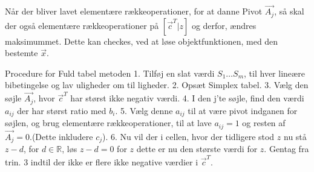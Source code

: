 Når der bliver lavet elementære rækkeoperationer, for at danne Pivot $\vec{A_j}$, så skal der også elementære rækkeoperationer på
$\left[\vec{c}^T | z\right]$ og derfor, ændres maksimummet. Dette kan checkes, ved at løse objektfunktionen, med den bestemte $\vec{x}$.
\begin{pro} [label=pro:simplex,numbers=none,xleftmargin=0em] {Procedure for Fuld tabel metoden}
1. Tilføj en slat værdi $S_1\dots S_m$, til hver lineære bibetingelse og lav uligheder om til ligheder.
2. Opsæt Simplex tabel.
3. Vælg den søjle $\vec{A_j}$, hvor $\vec{c}^T$ har størst ikke negativ værdi.
4. I den j'te søjle, find den værdi $a_{i j}$ der har størst ratio med $b_i$.
5. Vælg denne $a_{i j}$ til at være pivot indganen for søjlen, og brug elementære rækkeoperationer, til at lave $a_{i j}=1$ og resten af $\vec{A_j}=0$.(Dette inkludere $c_j$).
6. Nu vil der i cellen, hvor der tidligere stod $z$ nu stå $z-d$, for $d\in \mathds{R}$, løs $z-d=0$ for $z$ dette er nu den største værdi for $z$.
Gentag fra trin. 3 indtil der ikke er flere ikke negative værdier i $\vec{c}^T$.
\end{pro}

